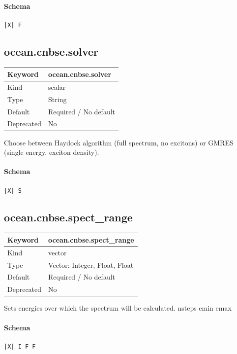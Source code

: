 \documentclass[11pt]{article}
\begin{document}
{{{{{\paragraph{Schema}
\begin{Verbatim}
|X| F
\end{Verbatim}

\subsection{ocean.cnbse.solver}
\label{kw:ocean-cnbse-solver}
\begin{longtable}{|p{1.5in}|p{4.5in}|}
\hline
Keyword & ocean.cnbse.solver \\
\hline
Kind & scalar \\
\hline
Type & String \\
\hline
Default & Required / No default \\
\hline
Deprecated & No \\
\hline
\end{longtable}
 Choose between Haydock algorithm (full spectrum, no excitons) or GMRES
 (single energy, exciton density).

\paragraph{Schema}
\begin{Verbatim}
|X| S
\end{Verbatim}

\subsection{ocean.cnbse.spect\_range}
\label{kw:ocean-cnbse-spect-range}
\begin{longtable}{|p{1.5in}|p{4.5in}|}
\hline
Keyword & ocean.cnbse.spect\_range \\
\hline
Kind & vector \\
\hline
Type & Vector: Integer, Float, Float \\
\hline
Default & Required / No default \\
\hline
Deprecated & No \\
\hline
\end{longtable}
 Sets energies over which the spectrum will be calculated.
 nsteps emin emax

\paragraph{Schema}
\begin{Verbatim}
|X| I F F
\end{Verbatim}

}}}}}
\end{document}
